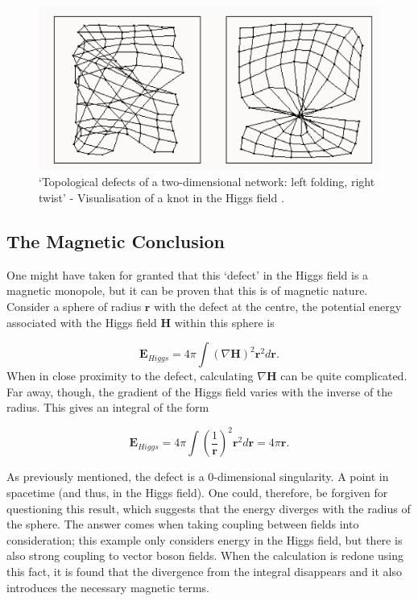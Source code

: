 \documentclass[twocolumn, 10pt]{article}
\begin{document}
\begin{figure}[h]
\includegraphics[width=\linewidth]{Topological_defect.png}
\caption{`Topological defects of a two-dimensional network: left folding, right twist' - Visualisation of a knot in the Higgs field \cite{topological2005defect}.}
\end{figure}

\subsection{The Magnetic Conclusion}
One might have taken for granted that this `defect' in the Higgs field is a magnetic monopole, but it can be proven that this is of magnetic nature. Consider a sphere of radius $\bm{r}$ with the defect at the centre, the potential energy associated with the Higgs field $\mathbf{H}$ within this sphere is

\begin{equation}
\mathbf{E}_{Higgs} = 4\pi \int (\nabla\mathbf{H})^2 \bm{r}^2 d\bm{r}.
\end{equation}
When in close proximity to the defect, calculating $\nabla\mathbf{H}$ can be quite complicated. Far away, though, the gradient of the Higgs field varies with the inverse of the radius. This gives an integral of the form

\begin{equation}
\mathbf{E}_{Higgs} = 4\pi \int \left(\frac{1}{\bm{r}}\right)^2 \bm{r}^2 d\bm{r} = 4\pi\bm{r}.
\end{equation}

As previously mentioned, the defect is a 0-dimensional singularity. A point in spacetime (and thus, in the Higgs field). One could, therefore, be forgiven for questioning this result, which suggests that the energy diverges with the radius of the sphere. The answer comes when taking coupling between fields into consideration; this example only considers energy in the Higgs field, but there is also strong coupling to vector boson fields. When the calculation is redone using this fact, it is found that the divergence from the integral disappears and it also introduces the necessary magnetic terms. \cite{guth2015lecs}
\end{document}
